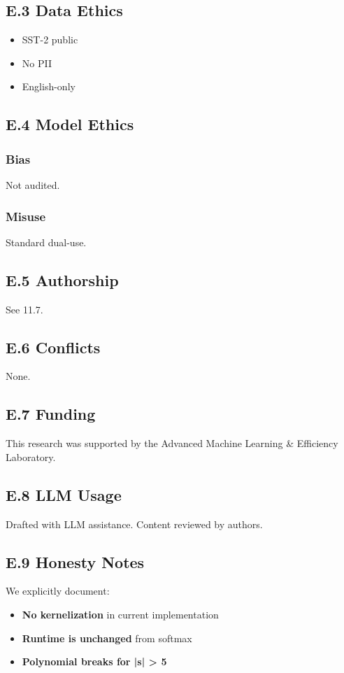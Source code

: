 \subsection{E.3 Data Ethics}

\begin{itemize}
\item SST-2 public
\item No PII
\item English-only

\end{itemize}
\subsection{E.4 Model Ethics}

\subsubsection{Bias}
Not audited.

\subsubsection{Misuse}
Standard dual-use.

\subsection{E.5 Authorship}

See  11.7.

\subsection{E.6 Conflicts}

None.

\subsection{E.7 Funding}

This research was supported by the Advanced Machine Learning \& Efficiency Laboratory.

\subsection{E.8 LLM Usage}

Drafted with LLM assistance. Content reviewed by authors.

\subsection{E.9 Honesty Notes}

We explicitly document:
\begin{itemize}
\item \textbf{No kernelization} in current implementation
\item \textbf{Runtime is unchanged} from softmax
\item \textbf{Polynomial breaks for |s| \textgreater{} 5}

\end{itemize}


